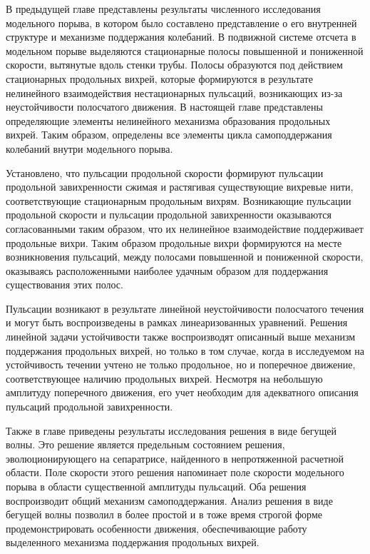 В предыдущей главе представлены результаты численного исследования модельного порыва, в котором было составлено представление о его внутренней структуре и механизме поддержания колебаний. В подвижной системе отсчета в модельном порыве выделяются стационарные полосы повышенной и пониженной скорости, вытянутые вдоль стенки трубы. Полосы образуются под действием стационарных продольных вихрей, которые формируются в результате нелинейного взаимодействия нестационарных пульсаций, возникающих из-за неустойчивости полосчатого движения. В настоящей главе представлены определяющие элементы нелинейного механизма образования продольных вихрей. Таким образом, определены все элементы цикла самоподдержания колебаний внутри модельного порыва. 

Установлено, что пульсации продольной скорости формируют пульсации продольной завихренности сжимая и растягивая существующие вихревые нити, соответствующие стационарным продольным вихрям. Возникающие пульсации продольной скорости и пульсации продольной завихренности оказываются согласованными таким образом, что их нелинейное взаимодействие поддерживает продольные вихри. Таким образом продольные вихри формируются на месте возникновения пульсаций, между полосами повышенной и пониженной скорости, оказываясь расположенными наиболее удачным образом для поддержания существования этих полос.

Пульсации возникают в результате линейной неустойчивости полосчатого течения и могут быть воспроизведены в рамках линеаризованных уравнений. Решения линейной задачи устойчивости также воспроизводят описанный выше механизм поддержания продольных вихрей, но только в том случае, когда в исследуемом на устойчивость течении учтено не только продольное, но и поперечное движение, соответствующее наличию продольных вихрей. Несмотря на небольшую амплитуду поперечного движения, его учет необходим для адекватного описания пульсаций продольной завихренности. 

Также в главе приведены результаты исследования решения в виде бегущей волны. Это решение является предельным состоянием решения, эволюционирующего на сепаратрисе, найденного в непротяженной расчетной области. Поле скорости этого решения напоминает поле скорости модельного порыва в области существенной амплитуды пульсаций. Оба решения воспроизводит общий механизм самоподдержания. Анализ решения в виде бегущей волны позволил в более простой и в тоже время строгой форме продемонстрировать особенности движения, обеспечивающие работу выделенного механизма поддержания продольных вихрей. 

